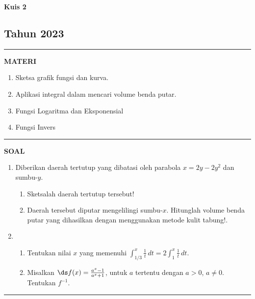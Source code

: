 \begin{flushright}
    \textbf{\Large{Kuis 2}}
    \subsection*{Tahun 2023}
\end{flushright}
\vspace{0.5cm}
\hrule height 2pt
\vspace{0.5cm}
\begin{center}
    \textbf{\large{MATERI}}
    \begin{enumerate}[leftmargin=*, label={\arabic*}.]
        \item Sketsa grafik fungsi dan kurva.
        \item Aplikasi integral dalam mencari volume benda putar.
        \item Fungsi Logaritma dan Eksponensial
        \item Fungsi Invers
    \end{enumerate}
\end{center}
\vspace{0.2cm}
\hrule height 1pt
\vspace{0.5cm}
\begin{center}
    \textbf{\large{SOAL}}
\end{center}
\begin{enumerate}[leftmargin=*, label={\arabic*}.]
\item Diberikan daerah tertutup yang dibatasi oleh parabola $x=2y-2y^{2}$ 
dan sumbu-$y$.
\begin{enumerate}[label={\alph*}.]
    \item Sketsalah daerah tertutup tersebut!
    \item Daerah tersebut diputar mengelilingi sumbu-$x$. Hitunglah volume 
    benda putar yang dihasilkan dengan menggunakan metode kulit tabung!.
\end{enumerate}
\item \begin{enumerate}[label={\alph*}.]
    \item Tentukan nilai $x$ yang memenuhi 
    $\int_{1/3}^{x}\frac{1}{t}\,dt=2\int_{1}^{x}\frac{1}{t}\,dt$.
    \item Misalkan $\ds f(x)=\frac{a^{x}-1}{a^{x}+1}$, untuk $a$ tertentu dengan $a > 0$, $a\neq 0$.
    Tentukan $f^{-1}$.
\end{enumerate}
\end{enumerate}
\vspace{0.2cm}
\hrule height 1pt
\vspace{0.5cm}

